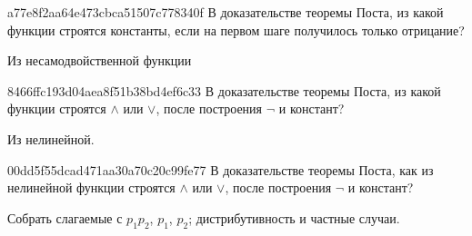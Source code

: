 \begin{note}{a77e8f2aa64e473cbca51507c778340f}
    В доказательстве теоремы Поста, из какой функции строятся константы, если на первом шаге получилось только отрицание?

    \begin{cloze}{1}
        Из несамодвойственной функции
    \end{cloze}
\end{note}

\begin{note}{8466ffc193d04aea8f51b38bd4ef6c33}
    В доказательстве теоремы Поста, из какой функции строятся \({ \land }\) или \({ \lor }\), после построения \({ \lnot }\) и констант?

    \begin{cloze}{1}
        Из нелинейной.
    \end{cloze}
\end{note}

\begin{note}{00dd5f55dcad471aa30a70c20c99fe77}
    В доказательстве теоремы Поста, как из нелинейной функции строятся \({ \land }\) или \({ \lor }\), после построения \({ \lnot }\) и констант?

    \begin{cloze}{1}
        Собрать слагаемые с \({ p_1p_2 }\),\: \({ p_1 }\),\: \({ p_2 }\); дистрибутивность и частные случаи.
    \end{cloze}
\end{note}


